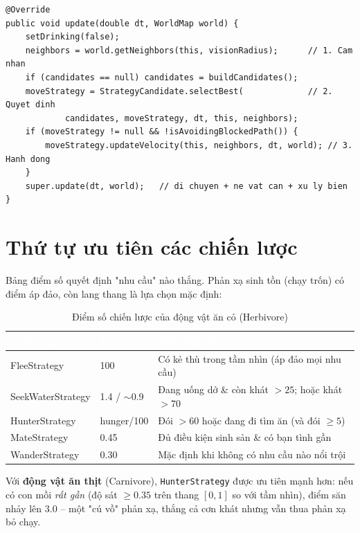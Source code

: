 \documentclass[12pt,a4paper]{report}
\newcommand{\keyword}[1]{\textcolor{primaryblue}{\textbf{#1}}}
\newcommand{\code}[1]{\texttt{\small #1}}
\begin{document}
\begin{lstlisting}[caption={Vòng đời quyết định của Herbivore}]
@Override
public void update(double dt, WorldMap world) {
    setDrinking(false);
    neighbors = world.getNeighbors(this, visionRadius);      // 1. Cam nhan
    if (candidates == null) candidates = buildCandidates();
    moveStrategy = StrategyCandidate.selectBest(             // 2. Quyet dinh
            candidates, moveStrategy, dt, this, neighbors);
    if (moveStrategy != null && !isAvoidingBlockedPath()) {
        moveStrategy.updateVelocity(this, neighbors, dt, world); // 3. Hanh dong
    }
    super.update(dt, world);   // di chuyen + ne vat can + xu ly bien
}
\end{lstlisting}

\section{Thứ tự ưu tiên các chiến lược}

Bảng điểm số quyết định "nhu cầu" nào thắng. Phản xạ sinh tồn (chạy trốn) có điểm áp đảo, còn lang thang là lựa chọn mặc định:

\begin{table}[H]
\centering
\caption{Điểm số chiến lược của động vật ăn cỏ (Herbivore)}
\begin{tabular}{L{3cm} C{2.5cm} L{6.5cm}}
\toprule
{}\textcolor{white}{\textbf{Chiến lược}} & \textcolor{white}{\textbf{Điểm}} & \textcolor{white}{\textbf{Điều kiện kích hoạt}} \\
\midrule
FleeStrategy & 100 & Có kẻ thù trong tầm nhìn (áp đảo mọi nhu cầu) \\
 SeekWaterStrategy & 1.4 / $\sim$0.9 & Đang uống dở \& còn khát $>25$; hoặc khát $>70$ \\
HunterStrategy & hunger/100 & Đói $>60$ hoặc đang đi tìm ăn (và đói $\geq 5$) \\
 MateStrategy & 0.45 & Đủ điều kiện sinh sản \& có bạn tình gần \\
WanderStrategy & 0.30 & Mặc định khi không có nhu cầu nào nổi trội \\
\bottomrule
\end{tabular}
\end{table}

Với \keyword{động vật ăn thịt} (Carnivore), \code{HunterStrategy} được ưu tiên mạnh hơn: nếu có con mồi \textit{rất gần} (độ sát $\geq 0.35$ trên thang $[0,1]$ so với tầm nhìn), điểm săn nhảy lên $3.0$ -- một "cú vồ" phản xạ, thắng cả cơn khát nhưng vẫn thua phản xạ bỏ chạy.
\end{document}
